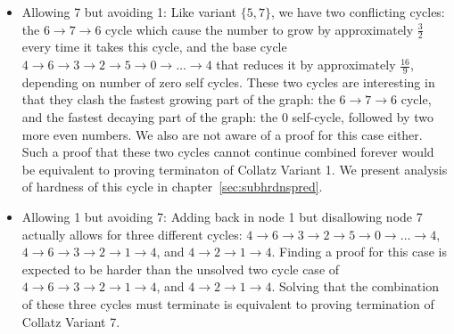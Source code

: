 \begin{itemize}
\begin{itemize}
        \item Allowing 7 but avoiding 1: Like variant $\{5,7\}$, we have two conflicting cycles: the $6 \rightarrow 7 \rightarrow 6$ cycle which cause the number to grow by approximately $\frac{3}{2}$ every time it takes this cycle, and the base cycle $4 \rightarrow 6 \rightarrow 3 \rightarrow 2 \rightarrow 5 \rightarrow 0 \rightarrow \ldots \rightarrow 4$ that reduces it by approximately $\frac{16}{9}$, depending on number of zero self cycles. These two cycles are interesting in that they clash the fastest growing part of the graph: the $6 \rightarrow 7 \rightarrow 6$ cycle, and the fastest decaying part of the graph: the 0 self-cycle, followed by two more even numbers. We also are not aware of a proof for this case either. Such a proof that these two cycles cannot continue combined forever would be equivalent to proving terminaton of Collatz Variant 1. We present analysis of hardness of this cycle in chapter~\ref{sec:subhrdnspred}.
        \item Allowing 1 but avoiding 7: Adding back in node 1 but disallowing node 7 actually allows for three different cycles: $4 \rightarrow 6 \rightarrow 3 \rightarrow 2 \rightarrow 5 \rightarrow 0 \rightarrow \ldots \rightarrow 4$, $4 \rightarrow 6 \rightarrow 3 \rightarrow 2 \rightarrow 1 \rightarrow 4$, and $4 \rightarrow 2 \rightarrow 1 \rightarrow 4$.  Finding a proof for this case is expected to be harder than the unsolved two cycle case of $4 \rightarrow 6 \rightarrow 3 \rightarrow 2 \rightarrow 1 \rightarrow 4$, and $4 \rightarrow 2 \rightarrow 1 \rightarrow 4$. Solving that the combination of these three cycles must terminate is equivalent to proving termination of Collatz Variant 7.
    \end{itemize}
\end{itemize}

